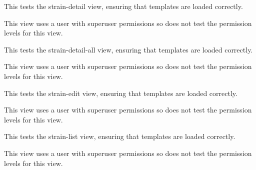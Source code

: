 \documentclass[letterpaper,10pt,english]{sphinxmanual}
\begin{document}
\begin{fulllineitems}

\begin{fulllineitems}
\label{animals:mousedb.animal.tests.StrainViewTests.test_strain_detail}
This tests the strain-detail view, ensuring that templates are loaded correctly.

This view uses a user with superuser permissions so does not test the permission levels for this view.

\end{fulllineitems}


\begin{fulllineitems}
\label{animals:mousedb.animal.tests.StrainViewTests.test_strain_detail_all}
This tests the strain-detail-all view, ensuring that templates are loaded correctly.

This view uses a user with superuser permissions so does not test the permission levels for this view.

\end{fulllineitems}


\begin{fulllineitems}
\label{animals:mousedb.animal.tests.StrainViewTests.test_strain_edit}
This tests the strain-edit view, ensuring that templates are loaded correctly.

This view uses a user with superuser permissions so does not test the permission levels for this view.

\end{fulllineitems}


\begin{fulllineitems}
\label{animals:mousedb.animal.tests.StrainViewTests.test_strain_list}
This tests the strain-list view, ensuring that templates are loaded correctly.

This view uses a user with superuser permissions so does not test the permission levels for this view.


\end{fulllineitems}
\end{fulllineitems}
\end{document}
